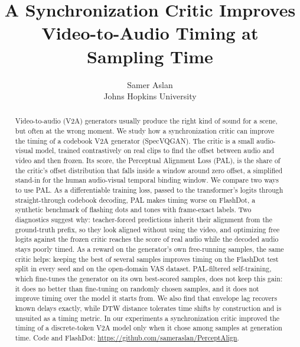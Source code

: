 \documentclass[10pt]{article}
\title{A Synchronization Critic Improves\\Video-to-Audio Timing at Sampling Time}
\author{Samer Aslan\\Johns Hopkins University}
\date{}
\begin{document}
\maketitle

\begin{abstract}
Video-to-audio (V2A) generators usually produce the right kind of sound for a scene, but often at the wrong moment. We study how a synchronization critic can improve the timing of a codebook V2A generator (SpecVQGAN). The critic is a small audio-visual model, trained contrastively on real clips to find the offset between audio and video and then frozen. Its score, the Perceptual Alignment Loss (PAL), is the share of the critic's offset distribution that falls inside a window around zero offset, a simplified stand-in for the human audio-visual temporal binding window. We compare two ways to use PAL. As a differentiable training loss, passed to the transformer's logits through straight-through codebook decoding, PAL makes timing worse on FlashDot, a synthetic benchmark of flashing dots and tones with frame-exact labels. Two diagnostics suggest why: teacher-forced predictions inherit their alignment from the ground-truth prefix, so they look aligned without using the video, and optimizing free logits against the frozen critic reaches the score of real audio while the decoded audio stays poorly timed. As a reward on the generator's own free-running samples, the same critic helps: keeping the best of several samples improves timing on the FlashDot test split in every seed and on the open-domain VAS dataset. PAL-filtered self-training, which fine-tunes the generator on its own best-scored samples, does not keep this gain: it does no better than fine-tuning on randomly chosen samples, and it does not improve timing over the model it starts from. We also find that envelope lag recovers known delays exactly, while DTW distance tolerates time shifts by construction and is unsuited as a timing metric. In our experiments a synchronization critic improved the timing of a discrete-token V2A model only when it chose among samples at generation time. Code and FlashDot: \url{https://github.com/sameraslan/PerceptAlign}.
\end{abstract}











\appendix

\end{document}
